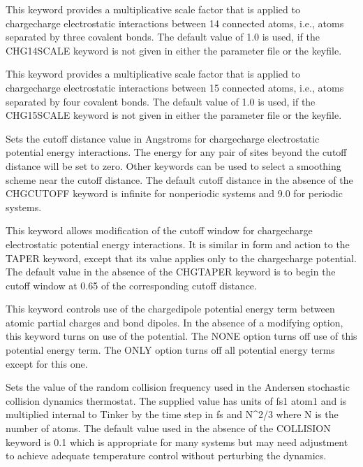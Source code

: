 \documentclass[letterpaper,11pt,english]{sphinxmanual}
\begin{document}
  This keyword provides a multiplicative scale factor that is applied to charge\sphinxhyphen{}charge electrostatic interactions between 1\sphinxhyphen{}4 connected atoms, i.e., atoms separated by three covalent bonds. The default value of 1.0 is used, if the CHG\sphinxhyphen{}14\sphinxhyphen{}SCALE keyword is not given in either the parameter file or the keyfile.

  This keyword provides a multiplicative scale factor that is applied to charge\sphinxhyphen{}charge electrostatic interactions between 1\sphinxhyphen{}5 connected atoms, i.e., atoms separated by four covalent bonds. The default value of 1.0 is used, if the CHG\sphinxhyphen{}15\sphinxhyphen{}SCALE keyword is not given in either the parameter file or the keyfile.

  Sets the cutoff distance value in Angstroms for charge\sphinxhyphen{}charge electrostatic potential energy interactions. The energy for any pair of sites beyond the cutoff distance will be set to zero. Other keywords can be used to select a smoothing scheme near the cutoff distance. The default cutoff distance in the absence of the CHG\sphinxhyphen{}CUTOFF keyword is infinite for nonperiodic systems and 9.0 for periodic systems.

  This keyword allows modification of the cutoff window for charge\sphinxhyphen{}charge electrostatic potential energy interactions. It is similar in form and action to the TAPER keyword, except that its value applies only to the charge\sphinxhyphen{}charge potential. The default value in the absence of the CHG\sphinxhyphen{}TAPER keyword is to begin the cutoff window at 0.65 of the corresponding cutoff distance.

  This keyword controls use of the charge\sphinxhyphen{}dipole potential energy term between atomic partial charges and bond dipoles. In the absence of a modifying option, this keyword turns on use of the potential. The NONE option turns off use of this potential energy term. The ONLY option turns off all potential energy terms except for this one.

  Sets the value of the random collision frequency used in the Andersen stochastic collision dynamics thermostat. The supplied value has units of fs\sphinxhyphen{}1 atom\sphinxhyphen{}1 and is multiplied internal to Tinker by the time step in fs and N\textasciicircum{}2/3 where N is the number of atoms. The default value used in the absence of the COLLISION keyword is 0.1 which is appropriate for many systems but may need adjustment to achieve adequate temperature control without perturbing the dynamics.
\end{document}
